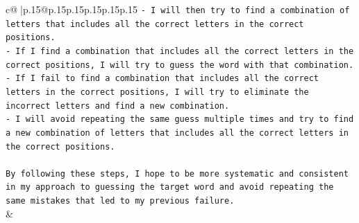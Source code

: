 \documentclass{article}
\begin{document}
{\begin{supertabular}{c@{$\;$}|p{.15\linewidth}@{}p{.15\linewidth}p{.15\linewidth}p{.15\linewidth}p{.15\linewidth}p{.15\linewidth}}
{{{\texttt{{-} I will then try to find a combination of letters that includes all the correct letters in the correct positions.} \\
\texttt{{-} If I find a combination that includes all the correct letters in the correct positions, I will try to guess the word with that combination.} \\
\texttt{{-} If I fail to find a combination that includes all the correct letters in the correct positions, I will try to eliminate the incorrect letters and find a new combination.} \\
\texttt{{-} I will avoid repeating the same guess multiple times and try to find a new combination of letters that includes all the correct letters in the correct positions.} \\
\\ 
\texttt{By following these steps, I hope to be more systematic and consistent in my approach to guessing the target word and avoid repeating the same mistakes that led to my previous failure.} \\
            }
        }
    }
    & \\ \\

\end{supertabular}
}
\end{document}
